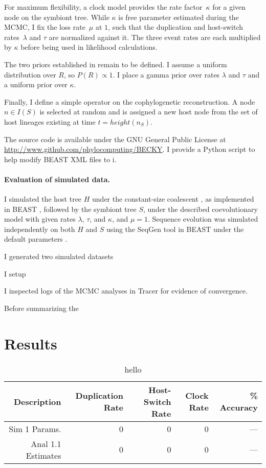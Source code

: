 \documentclass[12pt,letterpaper]{article}
\begin{document}
For maximum flexibility, a clock model provides the rate factor~$\kappa$ for a given node on the symbiont tree. While $\kappa$ is free parameter estimated during the \ac{MCMC}, I fix the loss rate~$\mu$ at $1$, such that the duplication and host-switch rates~$\lambda$ and $\tau$ are normalized against it. The three event rates are each multiplied by $\kappa$ before being used in likelihood calculations.

The two priors established in  remain to be defined. I assume a uniform distribution over $R$, so $P(R) \propto 1$. I place a gamma prior over rates $\lambda$ and $\tau$ and a uniform prior over $\kappa$.

Finally, I define a simple operator on the cophylogenetic reconstruction. A node $n \in I(S)$ is selected at random and is assigned a new host node from the set of host lineages existing at time $t = height(n_S)$.

The source code is available under the GNU General Public License at \url{http://www.github.com/phylocomputing/BECKY}. I provide a Python script to help modify BEAST XML files to i.

\paragraph*{Evaluation of simulated data.}

I simulated the host tree $H$ under the constant-size coalescent \parencite{Kingman:1982}, as implemented in BEAST \parencite{Drummond:2012}, followed by the symbiont tree $S$, under the described coevolutionary model with given rates $\lambda$, $\tau$, and $\kappa$, and $\mu=1$. Sequence evolution was simulated independently on both $H$ and $S$ using the SeqGen tool in BEAST under the default parameters \parencite{Drummond:2012}.

I generated two simulated datasets

I setup 

I inspected logs of the \ac{MCMC} analyses in Tracer \parencite{} for evidence of convergence.

Before summarizing the 

\section*{Results}

\begin{table}
\centering
\caption{hello}
\begin{tabular}{r r r r r}
\toprule
\textbf{Description} & \textbf{Duplication Rate} & \textbf{Host-Switch Rate} & \textbf{Clock Rate} & \textbf{\% Accuracy} \\
\midrule
Sim 1 Params. & 0 & 0 & 0 & --- \\
Anal 1.1 Estimates & 0 & 0 & 0 & --- \\
\bottomrule
\end{tabular}
\label{tab:coevaluation}
\end{table}
\end{document}
